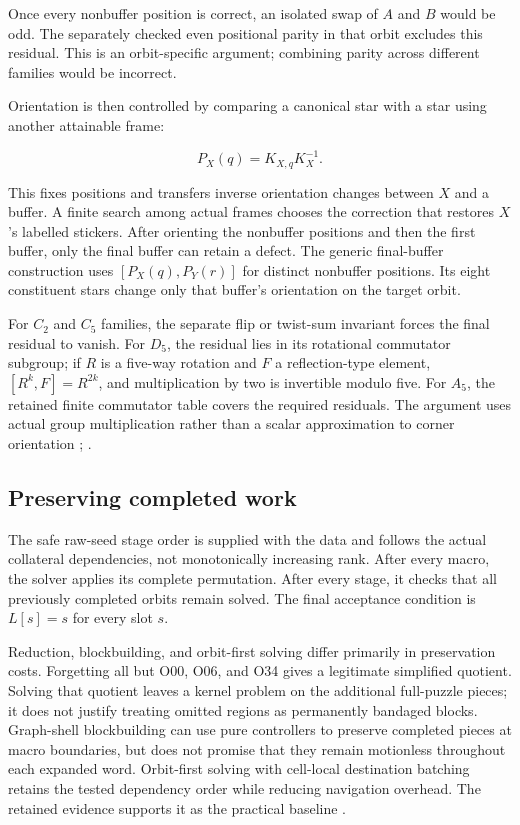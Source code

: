 \documentclass[a4paper,11pt]{article}
\begin{document}
Once every nonbuffer position is correct, an isolated swap of \(A\) and \(B\) would be odd. The separately checked even positional parity in that orbit excludes this residual. This is an orbit-specific argument; combining parity across different families would be incorrect.

Orientation is then controlled by comparing a canonical star with a star using another attainable frame:

\begin{equation}
P_X(q)=K_{X,q}K_X^{-1}.
\label{eq:orientation}
\end{equation}

This fixes positions and transfers inverse orientation changes between \(X\) and a buffer. A finite search among actual frames chooses the correction that restores \(X\)'s labelled stickers. After orienting the nonbuffer positions and then the first buffer, only the final buffer can retain a defect. The generic final-buffer construction uses \([P_X(q),P_Y(r)]\) for distinct nonbuffer positions. Its eight constituent stars change only that buffer's orientation on the target orbit.

For \(C_{2}\) and \(C_{5}\) families, the separate flip or twist-sum invariant forces the final residual to vanish. For \(D_{5}\), the residual lies in its rotational commutator subgroup; if \(R\) is a five-way rotation and \(F\) a reflection-type element, \([R^k,F]=R^{2k}\), and multiplication by two is invertible modulo five. For \(A_{5}\), the retained finite commutator table covers the required residuals. The argument uses actual group multiplication rather than a scalar approximation to corner orientation \cite[pp.~9--11]{transcript}; \cite[pp.~4--6]{algorithms}.

\subsection{Preserving completed work}

The safe raw-seed stage order is supplied with the data and follows the actual collateral dependencies, not monotonically increasing rank. After every macro, the solver applies its complete permutation. After every stage, it checks that all previously completed orbits remain solved. The final acceptance condition is \(L[s]=s\) for every slot \(s\).

Reduction, blockbuilding, and orbit-first solving differ primarily in preservation costs. Forgetting all but O00, O06, and O34 gives a legitimate simplified quotient. Solving that quotient leaves a kernel problem on the additional full-puzzle pieces; it does not justify treating omitted regions as permanently bandaged blocks. Graph-shell blockbuilding can use pure controllers to preserve completed pieces at macro boundaries, but does not promise that they remain motionless throughout each expanded word. Orbit-first solving with cell-local destination batching retains the tested dependency order while reducing navigation overhead. The retained evidence supports it as the practical baseline \cite[pp.~12--13]{transcript}.
\end{document}
